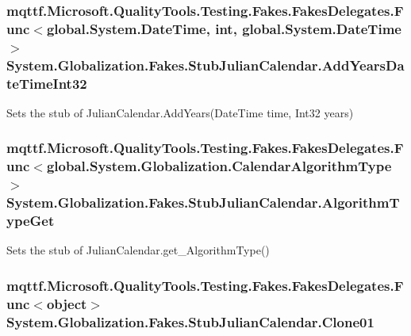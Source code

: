 \hypertarget{class_system_1_1_globalization_1_1_fakes_1_1_stub_julian_calendar_acf3e4c0374f7a40b07074700b34e052f}{
\subsubsection[{Add\-Years\-Date\-Time\-Int32}]{\setlength{\rightskip}{0pt plus 5cm}mqttf.\-Microsoft.\-Quality\-Tools.\-Testing.\-Fakes.\-Fakes\-Delegates.\-Func$<$global.\-System.\-Date\-Time, int, global.\-System.\-Date\-Time$>$ System.\-Globalization.\-Fakes.\-Stub\-Julian\-Calendar.\-Add\-Years\-Date\-Time\-Int32}}\label{class_system_1_1_globalization_1_1_fakes_1_1_stub_julian_calendar_acf3e4c0374f7a40b07074700b34e052f}


Sets the stub of Julian\-Calendar.\-Add\-Years(\-Date\-Time time, Int32 years)

\hypertarget{class_system_1_1_globalization_1_1_fakes_1_1_stub_julian_calendar_a1883a1d193e04bd90ecfe93b384a8fe1}{
\subsubsection[{Algorithm\-Type\-Get}]{\setlength{\rightskip}{0pt plus 5cm}mqttf.\-Microsoft.\-Quality\-Tools.\-Testing.\-Fakes.\-Fakes\-Delegates.\-Func$<$global.\-System.\-Globalization.\-Calendar\-Algorithm\-Type$>$ System.\-Globalization.\-Fakes.\-Stub\-Julian\-Calendar.\-Algorithm\-Type\-Get}}\label{class_system_1_1_globalization_1_1_fakes_1_1_stub_julian_calendar_a1883a1d193e04bd90ecfe93b384a8fe1}


Sets the stub of Julian\-Calendar.\-get\-\_\-\-Algorithm\-Type()

\hypertarget{class_system_1_1_globalization_1_1_fakes_1_1_stub_julian_calendar_acc618ea81cd9980bbd2129be73be4851}{
\subsubsection[{Clone01}]{\setlength{\rightskip}{0pt plus 5cm}mqttf.\-Microsoft.\-Quality\-Tools.\-Testing.\-Fakes.\-Fakes\-Delegates.\-Func$<$object$>$ System.\-Globalization.\-Fakes.\-Stub\-Julian\-Calendar.\-Clone01}}\label{class_system_1_1_globalization_1_1_fakes_1_1_stub_julian_calendar_acc618ea81cd9980bbd2129be73be4851}



